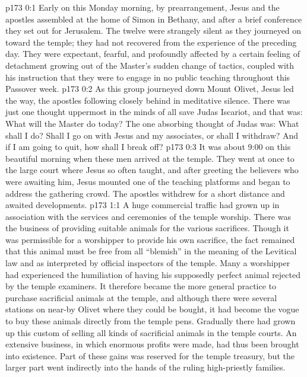 \author{Midwayer Commission}
\vs p173 0:1 Early on this Monday morning, by prearrangement, Jesus and the apostles assembled at the home of Simon in Bethany, and after a brief conference they set out for Jerusalem. The twelve were strangely silent as they journeyed on toward the temple; they had not recovered from the experience of the preceding day. They were expectant, fearful, and profoundly affected by a certain feeling of detachment growing out of the Master’s sudden change of tactics, coupled with his instruction that they were to engage in no public teaching throughout this Passover week.
\vs p173 0:2 As this group journeyed down Mount Olivet, Jesus led the way, the apostles following closely behind in meditative silence. There was just one thought uppermost in the minds of all save Judas Iscariot, and that was: What will the Master do today? The one absorbing thought of Judas was: What shall I do? Shall I go on with Jesus and my associates, or shall I withdraw? And if I am going to quit, how shall I break off?
\vs p173 0:3 It was about 9:00 on this beautiful morning when these men arrived at the temple. They went at once to the large court where Jesus so often taught, and after greeting the believers who were awaiting him, Jesus mounted one of the teaching platforms and began to address the gathering crowd. The apostles withdrew for a short distance and awaited developments.
\vs p173 1:1 A huge commercial traffic had grown up in association with the services and ceremonies of the temple worship. There was the business of providing suitable animals for the various sacrifices. Though it was permissible for a worshipper to provide his own sacrifice, the fact remained that this animal must be free from all “blemish” in the meaning of the Levitical law and as interpreted by official inspectors of the temple. Many a worshipper had experienced the humiliation of having his supposedly perfect animal rejected by the temple examiners. It therefore became the more general practice to purchase sacrificial animals at the temple, and although there were several stations on near\hyp{}by Olivet where they could be bought, it had become the vogue to buy these animals directly from the temple pens. Gradually there had grown up this custom of selling all kinds of sacrificial animals in the temple courts. An extensive business, in which enormous profits were made, had thus been brought into existence. Part of these gains was reserved for the temple treasury, but the larger part went indirectly into the hands of the ruling high\hyp{}priestly families.
